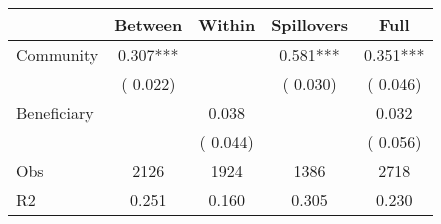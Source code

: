 
\begin{tabular}{l*{4}{c}}\hline&\multicolumn{1}{c}{Between}&\multicolumn{1}{c}{Within}&\multicolumn{1}{c}{Spillovers}&\multicolumn{1}{c}{Full}\\ \hline
 Community             &              0.307***      &                                               &        0.581*** &         0.351***                            \\ 
                               &        (       0.022)           &                                       &       (       0.030)     &      (       0.046)                                           \\ 
 Beneficiary   &                                               &        0.038    &                                &             0.032                            \\ 
                               &                                               & (       0.044)                  &                                        &      (       0.056)                                           \\ 
\hline                                                                                                                                                                                                                                            
 Obs                   &               2126               &       1924                       &       1386                &              2718                                               \\ 
 R2                    &                      0.251              &              0.160                      &              0.305               &                     0.230                                              \\ 
\hline \end{tabular}                                                                                                                                                                                                              